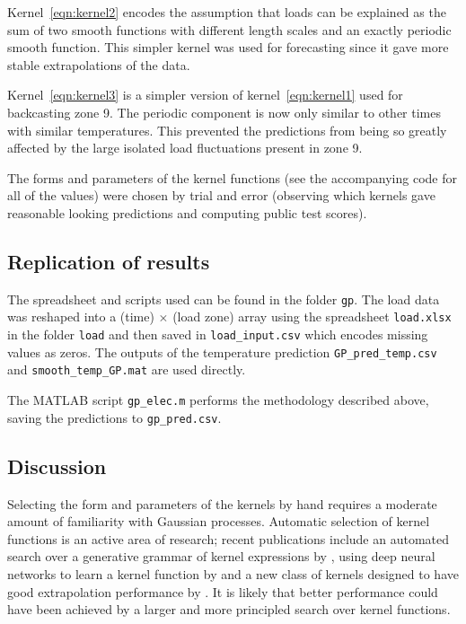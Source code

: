 \documentclass[final,authoryear,1p,times]{elsarticle}
\begin{document}
Kernel~\eqref{eqn:kernel2} encodes the assumption that loads can be explained as the sum of two smooth functions with different length scales and an exactly periodic smooth function.
This simpler kernel was used for forecasting since it gave more stable extrapolations of the data.

Kernel~\eqref{eqn:kernel3} is a simpler version of kernel~\eqref{eqn:kernel1} used for backcasting zone 9.
The periodic component is now only similar to other times with similar temperatures.
This prevented the predictions from being so greatly affected by the large isolated load fluctuations present in zone 9.

The forms and parameters of the kernel functions (see the accompanying code for all of the values) were chosen by trial and error (observing which kernels gave reasonable looking predictions and computing public test scores).

\subsection{Replication of results}

The spreadsheet and scripts used can be found in the folder \texttt{gp}.
The load data was reshaped into a (time) $\times$ (load zone) array using the spreadsheet \texttt{load.xlsx} in the folder \texttt{load} and then saved in \texttt{load\_input.csv} which encodes missing values as zeros.
The outputs of the temperature prediction \texttt{GP\_pred\_temp.csv} and \texttt{smooth\_temp\_GP.mat} are used directly.

The MATLAB script \texttt{gp\_elec.m} performs the methodology described above, saving the predictions to \texttt{gp\_pred.csv}.

\subsection{Discussion}

Selecting the form and parameters of the kernels by hand requires a moderate amount of familiarity with Gaussian processes.
Automatic selection of kernel functions is an active area of research; recent publications include an automated search over a generative grammar of kernel expressions by \cite{duvenaud2013structure}, using deep neural networks to learn a kernel function by \cite{salakhutdinov2008using} and a new class of kernels designed to have good extrapolation performance by \cite{wilson2013gaussian}.
It is likely that better performance could have been achieved by a larger and more principled search over kernel functions.
\end{document}
